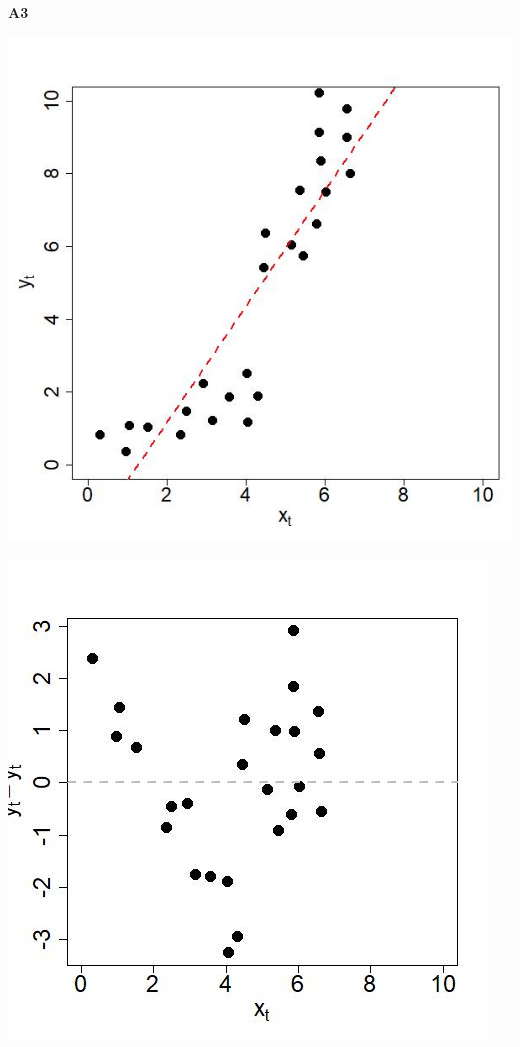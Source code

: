 \documentclass[captions=tableheading, 12pt, headings=small, parskip=half]{scrartcl}
\begin{document}
\begin{enumerate}[label = \alph*)]
{		\begin{minipage}{0.05\columnwidth}
		\begin{center}
			\Large \textbf{A3}
		\end{center}
		\end{minipage}
		\hfill
		\begin{minipage}{0.46\columnwidth}
			\includegraphics[width= \columnwidth]{Code1/A3.jpeg}
		\end{minipage}
		\hfill
		\begin{minipage}{0.46\columnwidth}
			\includegraphics[width= \columnwidth]{Code1/A3_res.jpeg}
		\end{minipage}
	}


\end{enumerate}
\end{document}
